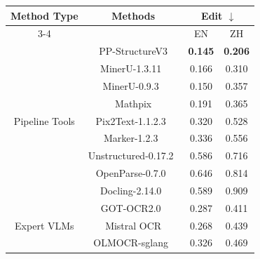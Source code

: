 \documentclass[11pt, a4paper, logo, copyright, nonumbering]{paddleocr}
\begin{document}
\begin{table}[!h]
    \centering
    \begin{threeparttable}
    \begin{tabular}{c|c|cc}
        \toprule
        \multirow{2}{*}{Method Type}    & \multirow{2}{*}{Methods}      & \multicolumn{2}{c}{Edit $\downarrow$} \\
                                                                          \cmidrule{3-4}              
                                        &                               & EN             & ZH             \\
        \midrule
        \multirow{9}{*}{Pipeline Tools} & PP-StructureV3                                        & \textbf{0.145} & \textbf{0.206} \\
                                        & MinerU-1.3.11~\citep{wang2024mineru}                    & 0.166          & 0.310          \\
                                        & MinerU-0.9.3~\citep{wang2024mineru}                     & 0.150          & 0.357          \\
                                        & Mathpix\tnote{1}                & 0.191          & 0.365          \\
                                        & Pix2Text-1.1.2.3~\citep{Pix2Text}                       & 0.320          & 0.528          \\
                                        & Marker-1.2.3~\citep{marker}                             & 0.336          & 0.556          \\
                                        & Unstructured-0.17.2~\citep{unstructured}                & 0.586          & 0.716          \\
                                        & OpenParse-0.7.0~\citep{open-parse}                      & 0.646          & 0.814          \\
                                        & Docling-2.14.0~\citep{Docling_Team_Docling}             & 0.589          & 0.909          \\
        \midrule
        \multirow{5}{*}{Expert VLMs}    & GOT-OCR2.0~\citep{wei2024general}                          & 0.287          & 0.411          \\
                                        & Mistral OCR\tnote{2}             & 0.268          & 0.439          \\
                                        & OLMOCR-sglang~\citep{poznanski2025olmocr}               & 0.326          & 0.469          \\

\end{tabular}
\end{threeparttable}
\end{table}
\end{document}
